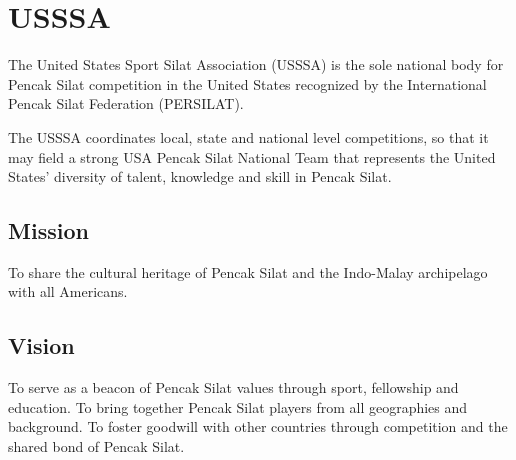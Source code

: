 \section*{USSSA}

The United States Sport Silat Association (USSSA) is the sole national body for Pencak Silat competition in the United States recognized by the International Pencak Silat Federation (PERSILAT).

The USSSA coordinates local, state and national level competitions, so that it may field a strong USA Pencak Silat National Team that represents the United States' diversity of talent, knowledge and skill in Pencak Silat.

\subsection*{Mission}
To share the cultural heritage of Pencak Silat and the Indo-Malay archipelago with all Americans.

\subsection*{Vision}
To serve as a beacon of Pencak Silat values through sport, fellowship and education.  To bring together Pencak Silat players from all geographies and background.  To foster goodwill with other countries through competition and the shared bond of Pencak Silat.

